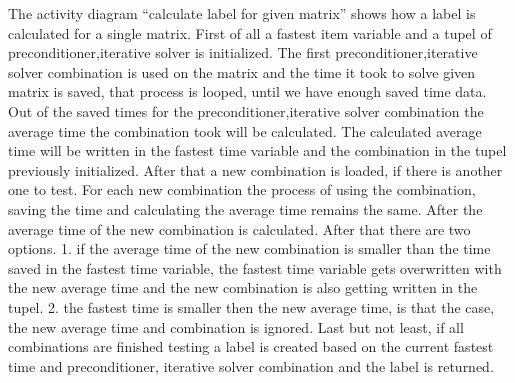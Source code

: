\documentclass[parskip=full]{scrartcl}
\begin{document}
\newpage
\begin{figure}[h]
\begin{center}

\label{Activity Diagrams}
\end{center}
\end{figure}
\newpage

The activity diagram ``calculate label for given matrix'' shows how a \gls{label} is calculated for a single matrix.
First of all a fastest item variable and a \gls{tupel} of \gls{preconditioner},\gls{iterative solver} is initialized.
The first \gls{preconditioner},\gls{iterative solver} combination is used on the matrix and the time it took to solve given matrix is saved, that process is looped, until we have enough saved time data.
Out of the saved times for the \gls{preconditioner},\gls{iterative solver} combination the average time the combination took will be calculated.
The calculated average time will be written in the fastest time variable and the combination in the \gls{tupel} previously initialized.
After that a new combination is loaded, if there is another one to test.
For each new combination the process of using the combination, saving the time and calculating the average time remains the same.
After the average time of the new combination is calculated.
After that there are two options.
1. if the average time of the new combination is smaller than the time saved in the fastest time variable, the fastest time variable gets overwritten with the new average time and the new combination is also getting written in the \gls{tupel}.
2. the fastest time is smaller then the new average time, is that the case, the new average time and combination is ignored.
Last but not least, if all combinations are finished testing a \gls{label} is created based on the current fastest time and \gls{preconditioner}, \gls{iterative solver} combination and the \gls{label} is returned.
\end{document}
